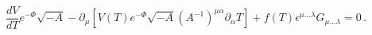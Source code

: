 \begin{equation}\label{Tachyon_bulk}
{\frac{dV}{dT}}e^{-\Phi}\sqrt{-A} - \partial_{\mu}
\left[V(T)e^{-\Phi} \sqrt{-A}(A^{-1})^{\mu\alpha}\partial_{\alpha}T
 \right]
+ f(T)\epsilon^{\mu\ldots\lambda}G_{\mu\ldots\lambda} =0 \, .
\end{equation}

